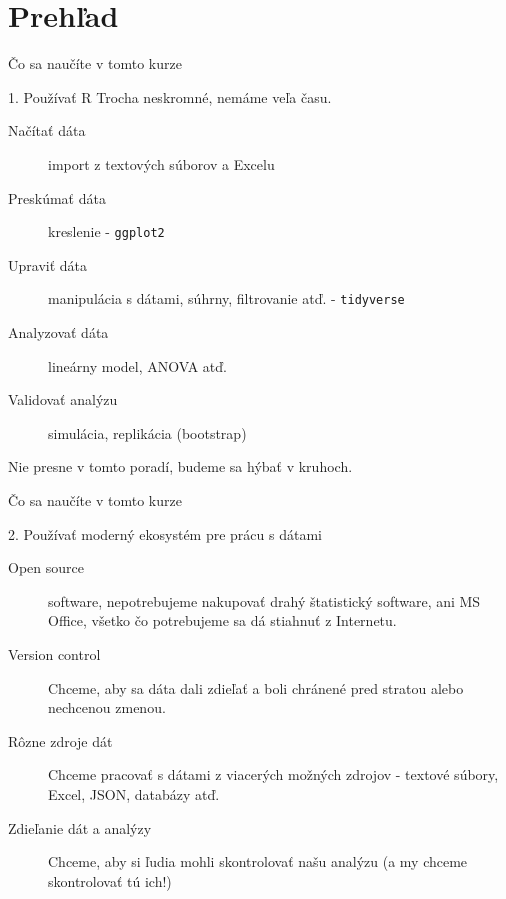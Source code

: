 \section{Prehľad}
\begin{frame}{Čo sa naučíte v tomto kurze}
	\begin{block}{1. Používať R}
		Trocha neskromné, nemáme veľa času.
		\begin{description}
			\item[Načítať dáta] import z textových súborov a Excelu
			\item[Preskúmať dáta] kreslenie - \texttt{ggplot2}
			\item[Upraviť dáta] manipulácia s dátami, súhrny, filtrovanie atď. - \texttt{tidyverse}
			\item[Analyzovať dáta] lineárny model, ANOVA atď.
			\item[Validovať analýzu] simulácia, replikácia (bootstrap)
		\end{description}
		Nie presne v tomto poradí, budeme sa hýbať v kruhoch.
	\end{block}
\end{frame}

\begin{frame}{Čo sa naučíte v tomto kurze}
	\begin{block}{2. Používať moderný ekosystém pre prácu s dátami}
		\begin{description}
			\item[Open source] software, nepotrebujeme nakupovať drahý štatistický software, ani MS Office, všetko čo potrebujeme sa dá stiahnuť z Internetu.
			\item[Version control] Chceme, aby sa dáta dali zdieľať a boli chránené pred stratou alebo nechcenou zmenou.
			\item[Rôzne zdroje dát] Chceme pracovať s dátami z viacerých možných zdrojov - textové súbory, Excel, JSON, databázy atď.
			\item[Zdieľanie dát a analýzy] Chceme, aby si ľudia mohli skontrolovať našu analýzu (a my chceme skontrolovať tú ich!)
		\end{description}
	\end{block}
\end{frame}



